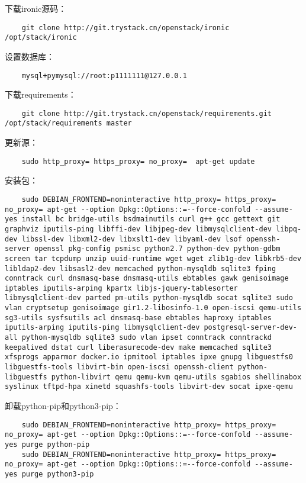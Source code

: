 \documentclass[a4paper,left=1.5cm,right=1.5cm,11pt]{article}
\begin{document}
	下载ironic源码：
	\begin{lstlisting}
	git clone http://git.trystack.cn/openstack/ironic /opt/stack/ironic
	\end{lstlisting}

	设置数据库：
	\begin{lstlisting}
	mysql+pymysql://root:p1111111@127.0.0.1
	\end{lstlisting}

	下载requirements：
	\begin{lstlisting}
	git clone http://git.trystack.cn/openstack/requirements.git /opt/stack/requirements master
	\end{lstlisting}

	更新源：
	\begin{lstlisting}
	sudo http_proxy= https_proxy= no_proxy=  apt-get update
	\end{lstlisting}

	安装包：
	\begin{lstlisting}
	sudo DEBIAN_FRONTEND=noninteractive http_proxy= https_proxy= no_proxy= apt-get --option Dpkg::Options::=--force-confold --assume-yes install bc bridge-utils bsdmainutils curl g++ gcc gettext git graphviz iputils-ping libffi-dev libjpeg-dev libmysqlclient-dev libpq-dev libssl-dev libxml2-dev libxslt1-dev libyaml-dev lsof openssh-server openssl pkg-config psmisc python2.7 python-dev python-gdbm screen tar tcpdump unzip uuid-runtime wget wget zlib1g-dev libkrb5-dev libldap2-dev libsasl2-dev memcached python-mysqldb sqlite3 fping conntrack curl dnsmasq-base dnsmasq-utils ebtables gawk genisoimage iptables iputils-arping kpartx libjs-jquery-tablesorter libmysqlclient-dev parted pm-utils python-mysqldb socat sqlite3 sudo vlan cryptsetup genisoimage gir1.2-libosinfo-1.0 open-iscsi qemu-utils sg3-utils sysfsutils acl dnsmasq-base ebtables haproxy iptables iputils-arping iputils-ping libmysqlclient-dev postgresql-server-dev-all python-mysqldb sqlite3 sudo vlan ipset conntrack conntrackd keepalived dstat curl liberasurecode-dev make memcached sqlite3 xfsprogs apparmor docker.io ipmitool iptables ipxe gnupg libguestfs0 libguestfs-tools libvirt-bin open-iscsi openssh-client python-libguestfs python-libvirt qemu qemu-kvm qemu-utils sgabios shellinabox syslinux tftpd-hpa xinetd squashfs-tools libvirt-dev socat ipxe-qemu
	\end{lstlisting}

	卸载python-pip和python3-pip：
	\begin{lstlisting}
	sudo DEBIAN_FRONTEND=noninteractive http_proxy= https_proxy= no_proxy= apt-get --option Dpkg::Options::=--force-confold --assume-yes purge python-pip
	sudo DEBIAN_FRONTEND=noninteractive http_proxy= https_proxy= no_proxy= apt-get --option Dpkg::Options::=--force-confold --assume-yes purge python3-pip
	\end{lstlisting}
\end{document}
